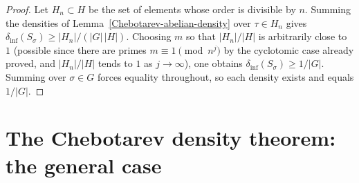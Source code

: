 \begin{proof}
Let $H_n \subset H$ be the set of elements whose order is divisible by $n$.  Summing the
densities of Lemma~\ref{Chebotarev-abelian-density} over $\tau\in H_n$ gives
$\delta_{\mathrm{inf}}(S_\sigma) \geq |H_n|/(|G|\,|H|)$.  Choosing $m$ so that $|H_n|/|H|$ is
arbitrarily close to $1$ (possible since there are primes $m\equiv 1\pmod{n^j}$ by the
cyclotomic case already proved, and $|H_n|/|H|$ tends to $1$ as $j\to\infty$), one obtains
$\delta_{\mathrm{inf}}(S_\sigma) \geq 1/|G|$.  Summing over $\sigma\in G$ forces equality
throughout, so each density exists and equals $1/|G|$.
\end{proof}
\section{The Chebotarev density theorem: the general case}

